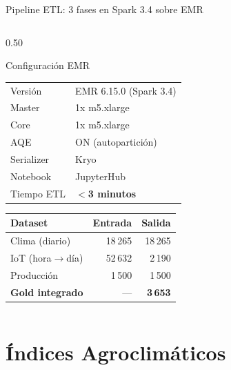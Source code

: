 \documentclass[14pt,aspectratio=169]{beamer}
\begin{document}
\begin{frame}{Pipeline ETL: 3 fases en Spark 3.4 sobre EMR}
\begin{columns}[T]
    \begin{column}{0.50\textwidth}
      \begin{exampleblock}{Configuraci\'on EMR}
        \footnotesize
        \begin{tabular}{ll}
          Versi\'on & EMR 6.15.0 (Spark 3.4) \\
          Master & 1x m5.xlarge \\
          Core & 1x m5.xlarge \\
          AQE & ON (autopartici\'on) \\
          Serializer & Kryo \\
          Notebook & JupyterHub \\
          Tiempo ETL & \textbf{$<$3 minutos} \\
        \end{tabular}
      \end{exampleblock}

      \vspace{0.3em}
      \begin{tabular}{lrr}
        \toprule
        Dataset & Entrada & Salida \\
        \midrule
        Clima (diario) & 18\,265 & 18\,265 \\
        IoT (hora$\to$d\'ia) & 52\,632 & 2\,190 \\
        Producci\'on & 1\,500 & 1\,500 \\
        \rowcolor{agroclear!50}
        \textbf{Gold integrado} & --- & \textbf{3\,653} \\
        \bottomrule
      \end{tabular}
    \end{column}
  \end{columns}
\end{frame}

\section{\'Indices Agroclim\'aticos}
\end{document}
